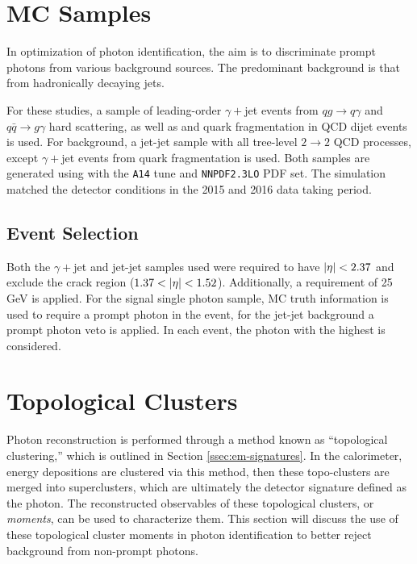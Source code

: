 \section{MC Samples} \label{sec:photon-id-samples}

In optimization of photon identification, the aim is to discriminate prompt photons from various background sources. The predominant background is that from hadronically decaying jets. 

For these studies, a sample of leading-order $\gamma+$jet events from $qg \rightarrow q \gamma$ and $q\bar{q} \rightarrow g \gamma$ hard scattering, as well as and quark fragmentation in QCD dijet events is used. For background, a jet-jet sample with all tree-level $2\rightarrow2$ QCD processes, except $\gamma+$jet events from quark fragmentation is used. Both samples are generated using \peight with the \texttt{A14} tune and \texttt{NNPDF2.3LO} PDF set. The simulation matched the detector conditions in the 2015 and 2016 data taking period. 

\subsection{Event Selection}

Both the $\gamma+$jet and jet-jet samples used were required to have $|\eta| < 2.37$ and exclude the crack region ($1.37<\abseta<1.52$). Additionally, a \pt requirement of 25 GeV is applied. For the signal single photon sample, \gls{MC} truth information is used to require a prompt photon in the event, for the jet-jet background a prompt photon veto is applied. In each event, the photon with the highest \pt is considered.


\section{Topological Clusters} \label{sec:topo-clusters-yid}

Photon reconstruction is performed through a method known as ``topological clustering,'' which is outlined in Section \ref{ssec:em-signatures}. In the calorimeter, energy depositions are clustered via this method, then these topo-clusters are merged into superclusters, which are ultimately the detector signature defined as the photon. The reconstructed observables of these topological clusters, or \textit{moments}, can be used to characterize them. This section will discuss the use of these topological cluster moments in photon identification to better reject background from non-prompt photons.

